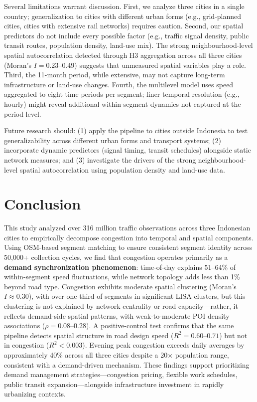 \documentclass[12pt,a4paper]{article}
\begin{document}
Several limitations warrant discussion. First, we analyze three cities in a single country; generalization to cities with different urban forms (e.g., grid-planned cities, cities with extensive rail networks) requires caution. Second, our spatial predictors do not include every possible factor (e.g., traffic signal density, public transit routes, population density, land-use mix). The strong neighbourhood-level spatial autocorrelation detected through H3 aggregation across all three cities (Moran's $I = 0.23$--$0.49$) suggests that unmeasured spatial variables play a role. Third, the 11-month period, while extensive, may not capture long-term infrastructure or land-use changes. Fourth, the multilevel model uses speed aggregated to eight time periods per segment; finer temporal resolution (e.g., hourly) might reveal additional within-segment dynamics not captured at the period level.

Future research should: (1) apply the pipeline to cities outside Indonesia to test generalizability across different urban forms and transport systems; (2) incorporate dynamic predictors (signal timing, transit schedules) alongside static network measures; and (3) investigate the drivers of the strong neighbourhood-level spatial autocorrelation using population density and land-use data.

\section{Conclusion}

This study analyzed over 316 million traffic observations across three Indonesian cities to empirically decompose congestion into temporal and spatial components. Using OSM-based segment matching to ensure consistent segment identity across 50,000+ collection cycles, we find that congestion operates primarily as a \textbf{demand synchronization phenomenon}: time-of-day explains 51--64\% of within-segment speed fluctuations, while network topology adds less than 1\% beyond road type. Congestion exhibits moderate spatial clustering (Moran's $I \approx 0.30$), with over one-third of segments in significant LISA clusters, but this clustering is not explained by network centrality or road capacity---rather, it reflects demand-side spatial patterns, with weak-to-moderate POI density associations ($\rho = 0.08$--$0.28$). A positive-control test confirms that the same pipeline detects spatial structure in road design speed ($R^2 = 0.60$--$0.71$) but not in congestion ($R^2 < 0.003$). Evening peak congestion exceeds daily averages by approximately 40\% across all three cities despite a 20$\times$ population range, consistent with a demand-driven mechanism. These findings support prioritizing demand management strategies---congestion pricing, flexible work schedules, public transit expansion---alongside infrastructure investment in rapidly urbanizing contexts.
\end{document}
